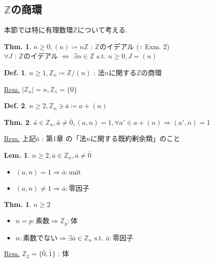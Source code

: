 \documentclass[uplatex,dvipdfmx,9pt]{beamer}
\newcommand{\st}{\text{ s.t. }}
\newcommand{\sscount}{\textsection \thesubsection}
\newcounter{textThmCount}
\newcounter{textLemCount}
\newcounter{textExmCount}
\theoremstyle{definition} %
\newtheorem{defn}{Def.}[subsection] %
\newtheorem{thm}{Thm.}[subsection] %
\newtheorem{thmText}[textThmCount]{Thm.}
\newtheorem{lemText}[textLemCount]{Lem.} %
\theoremstyle{example}
\begin{document}
    \subsection{\sscount \texorpdfstring{ $\mathbb{Z}$}{Z}の商環}
    \setcounter{textExmCount}{0}

    \begin{frame}
      本節では特に有理数環$\mathbb{Z}$について考える.
      
      \begin{thm}
        $n \ge 0, (n) \coloneqq n\mathbb{Z}$ : $\mathbb{Z}$のイデアル ($\because$  Exm. 2) \\
        $\forall J$ : $\mathbb{Z}$のイデアル $\Leftrightarrow$ $\exists n \in \mathbb{Z} \st n \ge 0, J = (n)$
      \end{thm}

      \begin{defn}
        $n \ge 1, \mathbb{Z}_n \coloneqq \mathbb{Z} / (n)$ : 法$n$に関する$\mathbb{Z}$の商環
      \end{defn}
      \underline{Rem.} $|\mathbb{Z}_n| = n, \mathbb{Z}_1 = \{0\}$

      \begin{defn}
        $n \ge 2, \mathbb{Z}_n \ni \bar{a} \coloneqq a + (n)$
      \end{defn}

    \end{frame}

    \begin{frame}

      \begin{thm}
        $\bar{a} \in \mathbb{Z}_n, \bar{a} \neq \bar{0}, (a, n) = 1, \forall a' \in a + (n) \Rightarrow (a', n) = 1$
      \end{thm}
      \underline{Rem.} 上記$\bar{a}$ : 第1章  の「法$n$に関する既約剰余類」のこと

      \begin{lemText}
        $n \ge 2, \bar{a} \in \mathbb{Z}_n, \bar{a} \neq \bar{0}$
        \begin{itemize}
          \item $(a, n) = 1 \Rightarrow \bar{a} : \text{unit}$
          \item $(a, n) \neq 1 \Rightarrow \bar{a} : \text{零因子}$
        \end{itemize}
      \end{lemText}

      \begin{thmText}
        $n \ge 2$
        \begin{itemize}
          \item $n = p : \text{素数} \Rightarrow \mathbb{Z}_p : \text{体}$
          \item $n : \text{素数でない} \Rightarrow \exists \bar{a} \in \mathbb{Z}_n \st \bar{a} : \text{零因子}$
        \end{itemize}
      \end{thmText}
      \underline{Rem.} $\mathbb{Z}_2 = \{\bar{0}, \bar{1}\}$ : 体

    \end{frame}
\end{document}
